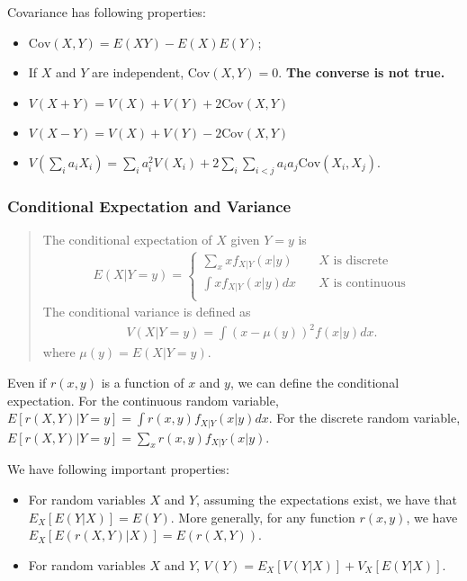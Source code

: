 \documentclass[
  12pt,
]{article}
\providecommand{\tightlist}{%
  \setlength{\itemsep}{0pt}\setlength{\parskip}{0pt}}
\begin{document}
Covariance has following properties:

\begin{itemize}
\tightlist
\item
  \(\mathrm{Cov}(X, Y) = E(XY) - E(X)E(Y)\);
\item
  If \(X\) and \(Y\) are independent, \(\mathrm{Cov}(X, Y) = 0\).
  \textbf{The converse is not true.}
\item
  \(V(X + Y) = V(X) + V(Y) + 2\mathrm{Cov}(X, Y)\)
\item
  \(V(X - Y) = V(X) + V(Y) - 2\mathrm{Cov}(X, Y)\)
\item
  \(V(\sum_i a_i X_i) = \sum_i a_i^2 V(X_i) + 2 \sum_i \sum_{i < j} a_i a_j \mathrm{Cov}(X_i, X_j)\).
\end{itemize}

\hypertarget{conditional-expectation-and-variance}{%
\subsubsection{Conditional Expectation and
Variance}\label{conditional-expectation-and-variance}}

\begin{quote}
The conditional expectation of \(X\) given \(Y = y\) is \begin{align*}
E(X|Y = y)
=
\begin{cases}
\sum_x x f_{X|Y}(x|y) &\quad\text{$X$ is discrete}  \\
\int x f_{X|Y}(x|y) dx &\quad\text{$X$ is continuous}  \\
\end{cases}
\end{align*} The conditional variance is defined as \begin{align*}
V(X | Y = y) = \int (x - \mu(y))^2 f(x|y) dx.
\end{align*} where \(\mu(y) = E(X | Y = y)\).
\end{quote}

Even if \(r(x, y)\) is a function of \(x\) and \(y\), we can define the
conditional expectation. For the continuous random variable,
\(E[r(X, Y) | Y = y] = \int r(x, y) f_{X|Y}(x|y) dx\). For the discrete
random variable, \(E[r(X, Y) | Y = y] = \sum_x r(x, y) f_{X|Y}(x|y)\).

We have following important properties:

\begin{itemize}
\tightlist
\item
  For random variables \(X\) and \(Y\), assuming the expectations exist,
  we have that \(E_X[ E(Y|X) ] = E(Y)\). More generally, for any
  function \(r(x, y)\), we have \(E_X[ E(r(X, Y)|X) ] = E(r(X, Y))\).
\item
  For random variables \(X\) and \(Y\),
  \(V(Y) = E_X[ V(Y|X) ] + V_X[ E(Y|X) ]\).
\end{itemize}
\end{document}
